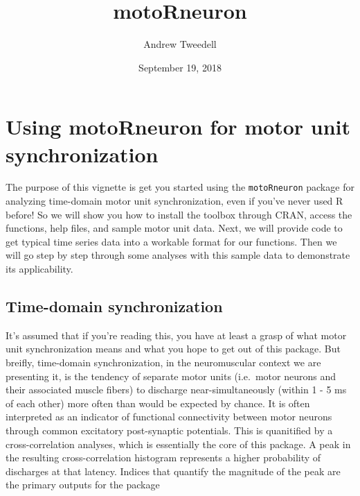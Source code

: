 \documentclass[]{article}
\title{motoRneuron}
\author{Andrew Tweedell}
\date{September 19, 2018}
\begin{document}
\maketitle

\section{Using motoRneuron for motor unit
synchronization}\label{using-motorneuron-for-motor-unit-synchronization}

The purpose of this vignette is get you started using the
\texttt{motoRneuron} package for analyzing time-domain motor unit
synchronization, even if you've never used R before! So we will show you
how to install the toolbox through CRAN, access the functions, help
files, and sample motor unit data. Next, we will provide code to get
typical time series data into a workable format for our functions. Then
we will go step by step through some analyses with this sample data to
demonstrate its applicability.

\subsection{Time-domain
synchronization}\label{time-domain-synchronization}

It's assumed that if you're reading this, you have at least a grasp of
what motor unit synchronization means and what you hope to get out of
this package. But breifly, time-domain synchronization, in the
neuromuscular context we are presenting it, is the tendency of separate
motor units (i.e.~motor neurons and their associated muscle fibers) to
discharge near-simultaneously (within 1 - 5 ms of each other) more often
than would be expected by chance. It is often interpreted as an
indicator of functional connectivity between motor neurons through
common excitatory post-synaptic potentials. This is quanitified by a
cross-correlation analyses, which is essentially the core of this
package. A peak in the resulting cross-correlation histogram represents
a higher probability of discharges at that latency. Indices that
quantify the magnitude of the peak are the primary outputs for the
package
\end{document}
